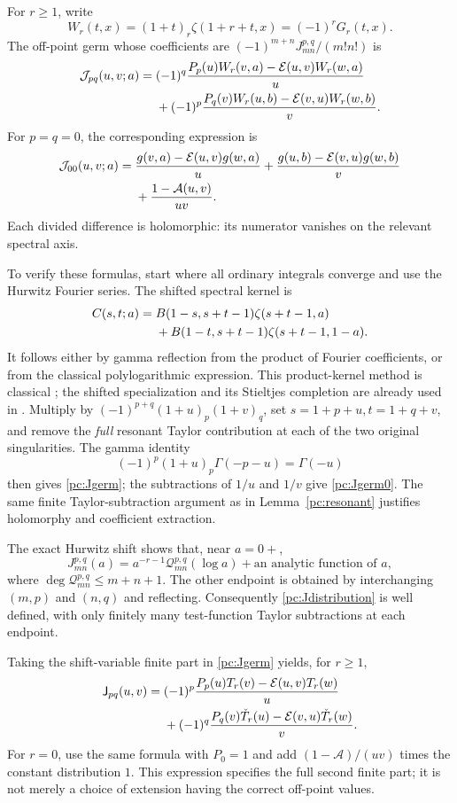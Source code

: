 \documentclass[11pt,a4paper]{article}
\numberwithin{equation}{section}
\theoremstyle{definition}
\newcommand{\Jf}{\mathsf J}
\newcommand{\Af}{\mathcal A}
\newcommand{\Ef}{\mathcal E}
\begin{document}
For $r\ge1$, write
\[
 W_r(t,x)=(1+t)_r\zeta(1+r+t,x)=(-1)^rG_r(t,x).
\]
The off-point germ whose coefficients are $(-1)^{m+n}J_{mn}^{p,q}/(m!n!)$ is
\begin{align}\label{pc:Jgerm}
 \mathcal J_{pq}(u,v;a)
 ={}&(-1)^q\frac{P_p(u)W_r(v,a)-\Ef(u,v)W_r(w,a)}u\\
 &+(-1)^p\frac{P_q(v)W_r(u,b)-\Ef(v,u)W_r(w,b)}v.\notag
\end{align}
For $p=q=0$, the corresponding expression is
\begin{align}\label{pc:Jgerm0}
 \mathcal J_{00}(u,v;a)
 ={}&\frac{g(v,a)-\Ef(u,v)g(w,a)}u
   +\frac{g(u,b)-\Ef(v,u)g(w,b)}v\notag\\
 &+\frac{1-\Af(u,v)}{uv}.
\end{align}
Each divided difference is holomorphic: its numerator vanishes on the relevant spectral axis.

To verify these formulas, start where all ordinary integrals converge and use the Hurwitz Fourier series. The shifted spectral kernel is
\begin{align}\label{pc:beta}
 C(s,t;a)={}&B(1-s,s+t-1)\zeta(s+t-1,a)\notag\\
 &+B(1-t,s+t-1)\zeta(s+t-1,1-a).
\end{align}
It follows either by gamma reflection from the product of Fourier coefficients, or from the classical polylogarithmic expression. This product-kernel method is classical \cite{pc:EM}; the shifted specialization and its Stieltjes completion are already used in \cite{pc:coincident}. Multiply by $(-1)^{p+q}(1+u)_p(1+v)_q$, set $s=1+p+u,t=1+q+v$, and remove the \emph{full} resonant Taylor contribution at each of the two original singularities. The gamma identity
\[
 (-1)^p(1+u)_p\Gamma(-p-u)=\Gamma(-u)
\]
then gives \eqref{pc:Jgerm}; the subtractions of $1/u$ and $1/v$ give \eqref{pc:Jgerm0}. The same finite Taylor-subtraction argument as in Lemma~\ref{pc:resonant} justifies holomorphy and coefficient extraction.

The exact Hurwitz shift shows that, near $a=0+$,
\[
 J_{mn}^{p,q}(a)=a^{-r-1}\mathcal Q_{mn}^{p,q}(\log a)
                         +\text{an analytic function of }a,
\]
where $\deg\mathcal Q_{mn}^{p,q}\le m+n+1$. The other endpoint is obtained by interchanging $(m,p)$ and $(n,q)$ and reflecting. Consequently \eqref{pc:Jdistribution} is well defined, with only finitely many test-function Taylor subtractions at each endpoint.

Taking the shift-variable finite part in \eqref{pc:Jgerm} yields, for $r\ge1$,
\begin{align}\label{pc:Jfpgen}
 \Jf_{pq}(u,v)
 ={}&(-1)^p\frac{P_p(u)T_r(v)-\Ef(u,v)T_r(w)}u\notag\\
 &+(-1)^q\frac{P_q(v)\check T_r(u)-\Ef(v,u)\check T_r(w)}v.
\end{align}
For $r=0$, use the same formula with $P_0=1$ and add $(1-\Af)/(uv)$ times the constant distribution $1$. This expression specifies the full second finite part; it is not merely a choice of extension having the correct off-point values.
\end{document}
